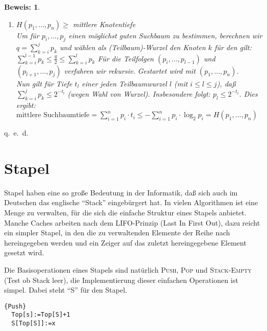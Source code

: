 \documentclass[ngerman,draft,parskip=half*,twoside]{scrreprt}
\theoremstyle{break}
\theoremstyle{nonumberbreak}
\newtheorem{beweis}{Beweis:}
\begin{document}
\begin{beweis}
\begin{enumerate}
    \item $\displaystyle H(p_1,\ldots,p_n)\geq$ mittlere Knotentiefe\\
      Um für $p_i,\ldots,p_j$ einen möglichst guten Suchbaum zu bestimmen, berechnen wir\\ $q=\sum_{k=i}^j p_k$ und wählen
      als (Teilbaum)-Wurzel den Knoten $k$ für den gilt: $\sum_{k=i}^{l-1}p_k\leq\frac{q}{2}\leq\sum_{k=i}^{l}p_k$
      Für die Teilfolgen $(p_i,\ldots,p_{l-1})$ und $(p_{l+1},\ldots,p_j)$ verfahren wir rekursiv. Gestartet wird mit $(p_1,\ldots,p_n)$.\\
      Nun gilt für Tiefe $t_l$ einer jeden Teilbaumwurzel $l$ (mit $i\leq l\leq j$), daß $\sum_{k=i}^j p_k \leq 2^{-t_l}$
      (wegen Wahl von Wurzel). Insbesondere folgt: $p_l\leq2^{-t_l}$. Dies ergibt:
      $\mbox{mittlere Suchbaumtiefe}=\sum_{i=1}^n p_i\cdot t_i\leq-\sum_{i=1}^n p_i\cdot \log_2p_i=H(p_1,\ldots,p_n)$
\end{enumerate}
\end{beweis}
\begin{flushright} q.~e.~d. \end{flushright}

\section{Stapel}
Stapel haben eine so große Bedeutung in der Informatik, daß sich auch im Deutschen das englische "`Stack"' eingebürgert hat.
In vielen Algorithmen ist eine Menge zu verwalten, für die sich die einfache Struktur eines Stapels anbietet.
Manche Caches arbeiten nach dem LIFO-Prinzip (Last In First Out), dazu reicht ein simpler Stapel, in den die zu verwaltenden Elemente
der Reihe nach hereingegeben werden und ein Zeiger auf das zuletzt hereingegebene Element gesetzt wird.

\begin{figure}[H]
  \centering
  \label{031203a}
\end{figure}

Die Basisoperationen eines Stapels sind natürlich \textsc{Push}, \textsc{Pop} und \textsc{Stack-Empty} (Test ob Stack leer), die Implementierung dieser einfachen
Operationen ist simpel. Dabei steht "`S"' für den Stapel.

\begin{Algorithmus}[H]
\begin{lstlisting}[frame=tlrb, mathescape=true, title=\textsc{Push}, gobble=1]{Push}
  Top[s]:=Top[S]+1
  S[Top[S]]:=x
\end{lstlisting}
\end{Algorithmus}
\end{document}
